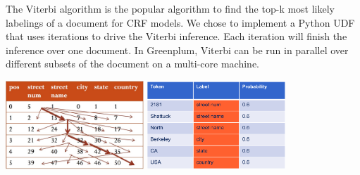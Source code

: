 \documentclass[landscape,final,a0paper,fontscale=0.285]{baposter}
\begin{document}
\begin{poster}
{\begin{multicols}{2}
The Viterbi algorithm is the popular algorithm to find the top-k most likely labelings of a document 
for CRF models. 
We chose to implement a Python UDF that uses iterations to drive the Viterbi inference. Each iteration will 
finish the inference over one document.
In Greenplum, Viterbi can be run in parallel over different subsets 
of the document on a multi-core machine.
\begin{center}		             
      \includegraphics[height=9em,width=14em]{images/viterbip}
      \includegraphics[height=9em,width=14em]{images/result.png}\\
\end{center}	
	             
\fbox{%
\[
V(i,y) =
\begin{cases}
 \max_{y^\prime}(V(i-1,y^\prime)) + \textstyle \sum_{k=1}^K \lambda_kf_k(y,y^\prime,x_i), & \text{if } i\ge0 \\
 0, & \text{if } i=-1.
\end{cases}
\]
}\\

\\
\\
\\


\end{multicols}}
\end{poster}
\end{document}
